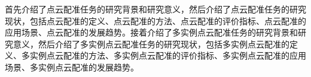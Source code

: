 首先介绍了点云配准任务的研究背景和研究意义，然后介绍了点云配准任务的研究现状，包括点云配准的定义、点云配准的方法、点云配准的评价指标、点云配准的应用场景、点云配准的发展趋势。接着介绍了多实例点云配准任务的研究背景和研究意义，然后介绍了多实例点云配准任务的研究现状，包括多实例点云配准的定义、多实例点云配准的方法、多实例点云配准的评价指标、多实例点云配准的应用场景、多实例点云配准的发展趋势。